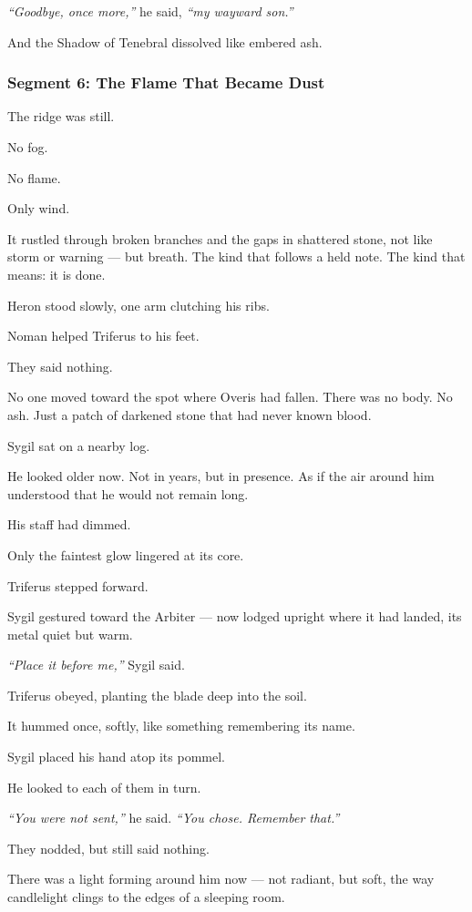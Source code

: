 \documentclass[9pt]{article}
\begin{document}
\textit{“Goodbye, once more,”} he said, \textit{“my wayward son.”}

And the Shadow of Tenebral dissolved like embered ash.

\newpage

\subsubsection*{Segment 6: The Flame That Became Dust}
The ridge was still.

No fog.

No flame.

Only wind.

It rustled through broken branches and the gaps in shattered stone, not like storm or warning — but breath. The kind that follows a held note. The kind that means: it is done.

Heron stood slowly, one arm clutching his ribs.

Noman helped Triferus to his feet.

They said nothing.

No one moved toward the spot where Overis had fallen. There was no body. No ash. Just a patch of darkened stone that had never known blood.

Sygil sat on a nearby log.

He looked older now. Not in years, but in presence. As if the air around him understood that he would not remain long.

His staff had dimmed.

Only the faintest glow lingered at its core.

\bigskip

Triferus stepped forward.

Sygil gestured toward the Arbiter — now lodged upright where it had landed, its metal quiet but warm.

\textit{“Place it before me,”} Sygil said.

Triferus obeyed, planting the blade deep into the soil.

It hummed once, softly, like something remembering its name.

Sygil placed his hand atop its pommel.

He looked to each of them in turn.

\textit{“You were not sent,”} he said. \textit{“You chose. Remember that.”}

They nodded, but still said nothing.

There was a light forming around him now — not radiant, but soft, the way candlelight clings to the edges of a sleeping room.
\end{document}
